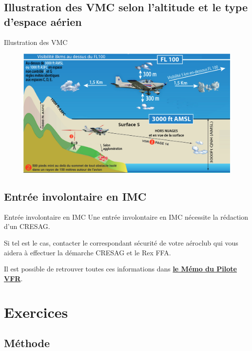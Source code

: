 \documentclass{beamer}
\begin{document}
\subsection{Illustration des VMC selon l'altitude et le type d'espace aérien}
\begin{frame}{Illustration des VMC}
  \begin{figure}
    \centering
    \includegraphics[scale=0.9]{images/conditions-vmc-graphique.png}
  \end{figure}
  
\end{frame}

\subsection{Entrée involontaire en IMC}
\begin{frame}{Entrée involontaire en IMC}
  Une entrée involontaire en IMC nécessite la rédaction d'un CRESAG.
  \vspace*{1em} \pause

  Si tel est le cas, contacter le correspondant sécurité de votre
  aéroclub qui vous aidera à effectuer la démarche CRESAG et le Rex
  FFA.
  \vspace*{1em} \pause

  Il est possible de retrouver toutes ces informations dans
  \textbf{\href{https://www.ffa-aero.fr/siteffaprod_web/fichiers_ffa/Piloter/MemoPiloteVFR.pdf}{le Mémo du Pilote VFR}}.
  
\end{frame}

\section{Exercices}
\subsection{Méthode}
\end{document}
